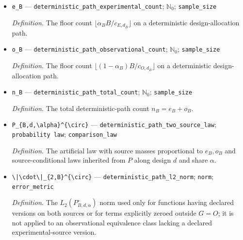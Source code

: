 \documentclass{article}
\begin{document}
\begin{itemize}
  \par\smallskip\noindent\emph{Definition.} The \(L_2(P_n^{\circ})\) norm in the cited fixed-design comparison.
  \item \texttt{e\_\allowbreak{}B} --- \texttt{deterministic\_\allowbreak{}path\_\allowbreak{}experimental\_\allowbreak{}count}; \(\mathbb N_0\); \texttt{sample\_\allowbreak{}size}
  \par\smallskip\noindent\emph{Definition.} The floor count \(\lfloor\alpha_BB/c_{E,d_B}\rfloor\) on a deterministic design-allocation path.
  \item \texttt{o\_\allowbreak{}B} --- \texttt{deterministic\_\allowbreak{}path\_\allowbreak{}observational\_\allowbreak{}count}; \(\mathbb N_0\); \texttt{sample\_\allowbreak{}size}
  \par\smallskip\noindent\emph{Definition.} The floor count \(\lfloor(1-\alpha_B)B/c_{O,d_B}\rfloor\) on a deterministic design-allocation path.
  \item \texttt{n\_\allowbreak{}B} --- \texttt{deterministic\_\allowbreak{}path\_\allowbreak{}total\_\allowbreak{}count}; \(\mathbb N_0\); \texttt{sample\_\allowbreak{}size}
  \par\smallskip\noindent\emph{Definition.} The total deterministic-path count \(n_B=e_B+o_B\).
  \item \texttt{P\_\allowbreak{}\{B,\allowbreak{}d,\allowbreak{}\textbackslash{}\allowbreak{}alpha\}\allowbreak{}\textasciicircum{}\{\textbackslash{}\allowbreak{}circ\}\allowbreak{}} --- \texttt{deterministic\_\allowbreak{}path\_\allowbreak{}two\_\allowbreak{}source\_\allowbreak{}law}; \texttt{probability law}; \texttt{comparison\_\allowbreak{}law}
  \par\smallskip\noindent\emph{Definition.} The artificial law with source masses proportional to \(e_B,o_B\) and source-conditional laws inherited from \(P\) along design \(d\) and share \(\alpha\).
  \item \texttt{\textbackslash{}\allowbreak{}|\textbackslash{}\allowbreak{}cdot\textbackslash{}\allowbreak{}|\_\allowbreak{}\{2,\allowbreak{}B\}\allowbreak{}\textasciicircum{}\{\textbackslash{}\allowbreak{}circ\}\allowbreak{}} --- \texttt{deterministic\_\allowbreak{}path\_\allowbreak{}l2\_\allowbreak{}norm}; \texttt{norm}; \texttt{error\_\allowbreak{}metric}
  \par\smallskip\noindent\emph{Definition.} The \(L_2(P_{B,d,\alpha}^{\circ})\) norm used only for functions having declared versions on both sources or for terms explicitly zeroed outside \(G=O\); it is not applied to an observational equivalence class lacking a declared experimental-source version.

\end{itemize}
\end{document}
